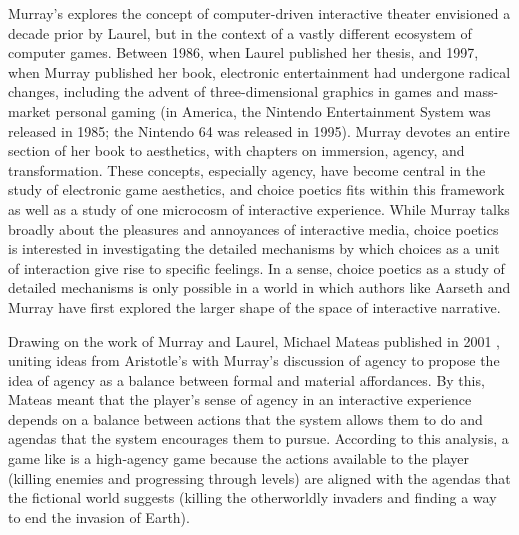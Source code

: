 Murray's  explores the concept of computer-driven interactive theater envisioned a decade prior by Laurel, but in the context of a vastly different ecosystem of computer games.
%
Between 1986, when Laurel published her thesis, and 1997, when Murray published her book, electronic entertainment had undergone radical changes, including the advent of three-dimensional graphics in games and mass-market personal gaming (in America, the Nintendo Entertainment System was released in 1985; the Nintendo 64 was released in 1995).
%
Murray devotes an entire section of her book to aesthetics, with chapters on immersion, agency, and transformation.
%
These concepts, especially agency, have become central in the study of electronic game aesthetics, and choice poetics fits within this framework as well as a study of one microcosm of interactive experience.
%
While Murray talks broadly about the pleasures and annoyances of interactive media, choice poetics is interested in investigating the detailed mechanisms by which choices as a unit of interaction give rise to specific feelings.
%
In a sense, choice poetics as a study of detailed mechanisms is only possible in a world in which authors like Aarseth and Murray have first explored the larger shape of the space of interactive narrative.


Drawing on the work of Murray and Laurel, Michael Mateas published  in 2001 \citep{Mateas2001}, uniting ideas from Aristotle's  with Murray's discussion of agency to propose the idea of agency as a balance between formal and material affordances.
%
By this, Mateas meant that the player's sense of agency in an interactive experience depends on a balance between actions that the system allows them to do and agendas that the system encourages them to pursue.
%
According to this analysis, a game like  \citep{Quake} is a high-agency game because the actions available to the player (killing enemies and progressing through levels) are aligned with the agendas that the fictional world suggests (killing the otherworldly invaders and finding a way to end the invasion of Earth).
%




